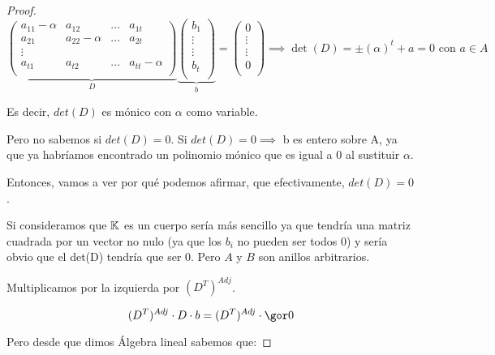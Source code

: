 \begin{proof}
	\[
	\underbrace{
	\left( \begin{array}{cccc}
	a_{11}-\alpha & a_{12} & ... & a_{1t} \\
	a_{21} & a_{22} -\alpha & ... & a_{2t} \\
	\vdots & & & \\
	a_{t1} & a_{t2}& ... & a_{tt} - \alpha \\
	\end{array}
	\right)}_{D}
	\underbrace{
	\left( \begin{array}{c}
	b_1 \\
	\vdots \\
	\vdots \\
	b_t\\
	\end{array}
	\right)}_{b} =
	\left( \begin{array}{c}
	0 \\
	\vdots\\
	\vdots \\
	0\\
	\end{array}
	\right) \implies \det(D)= \pm(\alpha)^t+ a=0 \text{ con } a \in A
	\]

	Es decir, $det(D)$ es mónico con $\alpha$ como variable.

	Pero no sabemos si $det(D)=0$. Si $det(D)=0 \implies$ b es entero sobre A, ya que ya habríamos encontrado un polinomio mónico que es igual a 0 al sustituir $\alpha$.

	Entonces, vamos a ver por qué podemos afirmar, que efectivamente, $det(D)=0$.

	Si consideramos que $\mathbb{K}$ es un cuerpo sería más sencillo ya que  tendría una matriz cuadrada por un vector no nulo (ya que los $b_i$ no pueden ser todos 0) y sería obvio que el det(D) tendría que ser 0. Pero $A$ y $B$ son anillos arbitrarios.

	Multiplicamos por la izquierda por $ (D^T)^{Adj}$.

	$$ (D^T)^{Adj}\cdot D \cdot b = (D^T)^{Adj}\cdot \cls{0} $$

	Pero desde que dimos Álgebra lineal sabemos que:


\end{proof}
